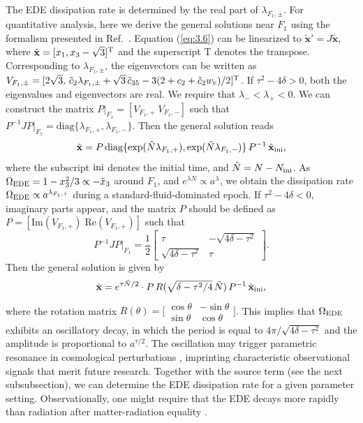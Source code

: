 \documentclass[aps,prd,twocolumn]{revtex4-2}
\newcommand\subEDE{{\rm EDE}}
\newcommand\subF{\textsc{f}}
\newcommand\subini{{\rm ini}}
\begin{document}
The EDE dissipation rate is determined by the real part of $\lambda_{F_1,\pm}$. For quantitative analysis, here we derive the general solutions near $F_1$ using the formalism presented in Ref.~\cite{Perko2001.book}. Equation (\ref{eq:3.6}) can be linearized to $\tilde{\mathbf{x}}'=J\tilde{\mathbf{x}}$, where $\tilde{\mathbf{x}}=[x_1,x_3-\sqrt{3}]^{\rm T}$ and the superscript $\mathrm{T}$ denotes the transpose. Corresponding to $\lambda_{F_1,\pm}$, the eigenvectors can be written as $V_{F_1,\pm}=[2\sqrt{3},\,\tilde{c}_2\lambda_{F_1,\pm} + \sqrt{3}\,\tilde{c}_{35} - 3(2+c_2+\tilde{c}_2w_\subF)/2]^{\rm T}$. If $\tau^2-4\delta>0$, both the eigenvalues and eigenvectors are real. We require that $\lambda_-<\lambda_+<0$. We can construct the matrix $P|_{F_1}=[V_{F_1,+}\;V_{F_1,-}]$ such that $P^{-1}JP|_{F_1}=\mathrm{diag}\{\lambda_{F_1,+},\lambda_{F_1,-}\}$. Then the general solution reads
\begin{equation}\label{eq:3.9}
  \tilde{\mathbf{x}}
  =
  P\,
  \mathrm{diag}\{\exp(\tilde{N}\lambda_{F_1,+}),\exp(\tilde{N}\lambda_{F_1,-})\}\,
  P^{-1}\,
  \tilde{\mathbf{x}}_\subini,
\end{equation}
where the subscript $\subini$ denotes the initial time, and $\tilde{N}=N-N_\subini$.  As $\Omega_\subEDE=1-x_3^2/3\propto -\tilde{x}_3$ around $F_1$, and $e^{\lambda N}\propto a^\lambda$, we obtain the dissipation rate $\Omega_\subEDE\propto a^{\lambda_{F_1,+}}$ during a standard-fluid-dominated epoch. If $\tau^2-4\delta<0$, imaginary parts appear, and the matrix $P$ should be defined as $P=[\mathrm{Im}(V_{F_1,+})\;\mathrm{Re}(V_{F_1,+})]$ such that 
\begin{equation}\nonumber
  P^{-1}JP|_{F_1}
  =
  \frac{1}{2}
  \begin{bmatrix}
    \tau & -\sqrt{4\delta-\tau^2} \\
    \sqrt{4\delta-\tau^2} & \tau 
  \end{bmatrix}.
\end{equation}
Then the general solution is given by
\begin{equation}\label{eq:3.10}
  \tilde{\mathbf{x}}
  =
  e^{\tau\tilde{N}/2}\cdot
  P\,
  R(\sqrt{\delta-\tau^2/4}\,\tilde{N})\,
  P^{-1}\,
  \tilde{\mathbf{x}}_\subini,
\end{equation}
where the rotation matrix $R(\theta)=\big[\begin{smallmatrix}
                                       \cos\theta & -\sin\theta \\
                                       \sin\theta & \cos\theta
                                     \end{smallmatrix}\big]$. 
This implies that $\Omega_\subEDE$ exhibits an oscillatory decay, in which the period is equal to $4\pi/\sqrt{4\delta-\tau^2}$ and the amplitude is proportional to $a^{\tau/2}$. The oscillation may trigger parametric resonance in cosmological perturbations \cite{Smith2020.PRD.101.063523}, imprinting characteristic observational signals that merit  future research.  Together with the source term (see the next subsubsection), we can determine the EDE dissipation rate for a given parameter setting. Observationally, one might require that the EDE decays more rapidly than radiation after matter-radiation equality \cite{Poulin2019.PRL.122.221301}.
\end{document}
